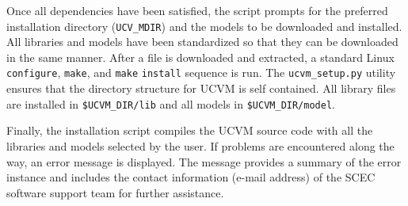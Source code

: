 Once all dependencies have been satisfied, the script prompts for the preferred installation directory (\texttt{UCV\_MDIR}) and the models to be downloaded and installed. All libraries and models have been standardized so that they can be downloaded in the same manner. After a file is downloaded and extracted, a standard Linux \texttt{configure}, \texttt{make}, and \texttt{make} \texttt{install} sequence is run. The \texttt{ucvm\_setup.py} utility ensures that the directory structure for UCVM is self contained. All library files are installed in \texttt{\$UCVM\_DIR/lib} and all models in \texttt{\$UCVM\_DIR/model}.

Finally, the installation script compiles the UCVM source code with all the libraries and models selected by the user. If problems are encountered along the way, an error message is displayed. The message provides a summary of the error instance and includes the contact information (e-mail address) of the SCEC software support team for further assistance.



